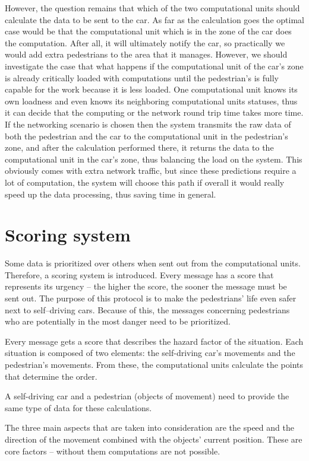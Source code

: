 \documentclass[conference]{IEEEtran}
\begin{document}
However, the question remains that which of the two computational units should calculate the data to be sent to the car. As far as the calculation goes the optimal case would be that the computational unit which is in the zone of the car does the computation. After all, it will ultimately notify the car, so practically we would add extra pedestrians to the area that it manages. However, we should investigate the case that what happens if the computational unit of the car’s zone is already critically loaded with computations until the pedestrian's is fully capable for the work because it is less loaded. One computational unit knows its own loadness and even knows its neighboring computational units statuses, thus it can decide that the computing or the network round trip time takes more time. If the networking scenario is chosen then the system transmits the raw data of both the pedestrian and the car to the computational unit in the pedestrian's zone, and after the calculation performed there, it returns the data to the computational unit in the car’s zone, thus balancing the load on the system. This obviously comes with extra network traffic, but since these predictions require a lot of computation, the system will choose this path if overall it would really speed up the data processing, thus saving time in general.

\section{Scoring system}

Some data is prioritized over others when sent out from the computational units. Therefore, a scoring system is introduced. Every message has a score that represents its urgency -- the higher the score, the sooner the message must be sent out. The purpose of this protocol is to make the pedestrians’ life even safer next to self--driving cars. Because of this, the messages concerning pedestrians who are potentially in the most danger need to be prioritized.

Every message gets a score that describes the hazard factor of the situation. Each situation is composed of two elements: the self-driving car's movements and the pedestrian's movements. From these, the computational units calculate the points that determine the order.

A self-driving car and a pedestrian (objects of movement) need to provide the same type of data for these calculations.

The three main aspects that are taken into consideration are the speed and the direction of the movement combined with the objects’ current position. These are core factors -- without them computations are not possible.
\end{document}
